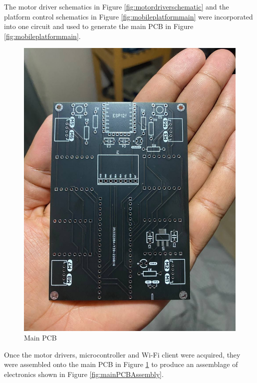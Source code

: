 The motor driver schematics in Figure \ref{fig:motordriverschematic} and the platform control schematics in Figure \ref{fig:mobileplatformmain} were incorporated into one circuit and used to generate the main \ac{PCB} in Figure \ref{fig:mobileplatformmain}.

\begin{figure}[H]
    \centering
    \includegraphics[scale = 0.25]{Figures/driverPCB.jpg}
    \caption{Main \ac{PCB}}
    \label{fig:PCB}
\end{figure}

Once the motor drivers, microcontroller and Wi-Fi client were acquired, they were assembled onto the main \ac{PCB} in Figure \ref{fig:PCB} to produce an assemblage of electronics shown in Figure \ref{fig:mainPCBAssembly}.


